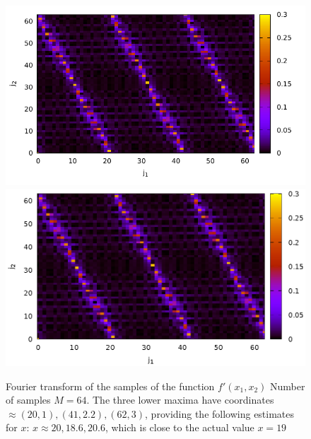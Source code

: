 \begin{figure}
\centering

\ifpdf
\includegraphics[angle=0]
{./part4/quantcomp/picdiscretlog4.pdf}
\else
\includegraphics[angle=0]
{./part4/quantcomp/picdiscretlog4.eps}
\fi

%

\caption{Fourier transform of the samples of the function 
$f'(x_1, x_2)$
Number of samples $M=64$. The three lower maxima have coordinates $\approx (20,1), (41,2.2), (62,
3)$, providing the following estimates for $x$: $x \approx 20, 18.6, 20.6$,
which is close to the actual value $x = 19$
} 
\label{fig:part4:quantcomp:dl4}
\end{figure}
